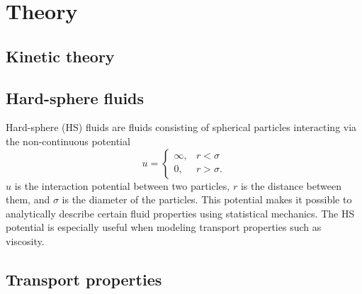 \section{Theory}
\label{sec:theory}

\subsection{Kinetic theory}

\subsection{Hard-sphere fluids}
Hard-sphere (HS) fluids are fluids consisting of spherical particles 
interacting via the non-continuous potential 
\begin{equation}
    \label{eq:hard_sphere_potential}
    u = 
    \begin{cases}
        \infty, & r < \sigma \\
        0, & r > \sigma.
    \end{cases}
\end{equation}
$u$ is the interaction potential between two particles, 
$r$ is the distance between them, 
and $\sigma$ is the diameter of the particles.
This potential makes it possible to analytically describe 
certain fluid properties using statistical mechanics. 
The HS potential is especially useful when modeling 
transport properties such as viscosity.


\subsection{Transport properties}


